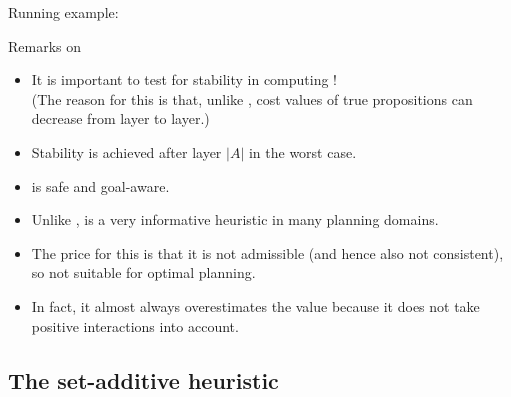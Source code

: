 \documentclass{gkibeamer}
\begin{document}
\begin{frame}{Running example: \hadd}
\begin{center}
  \end{center}
\end{frame}

\begin{frame}{Remarks on {\hadd}}
  \begin{itemize}
  \item It is important to test for stability in computing \hadd! \\
    (The reason for this is that, unlike \hmax, cost values of true
    propositions can \alert{decrease} from layer to layer.)
  \item Stability is achieved after layer $|A|$ in the worst case.
  \item {\hadd} is \alert{safe} and \alert{goal-aware}.
  \item Unlike {\hmax}, \alert{\hadd} is a \alert{very informative}
    heuristic in many planning domains.
  \item The price for this is that it is \alert{not admissible} (and
    hence also \alert{not consistent}), so not suitable for optimal
    planning.
  \item In fact, it \alert{almost always} overestimates the {\hplus}
    value because it does not take \alert{positive interactions} into
    account.
  \end{itemize}
\end{frame}

\subsection[\hsa]{The set-additive heuristic \hsa}
\end{document}
